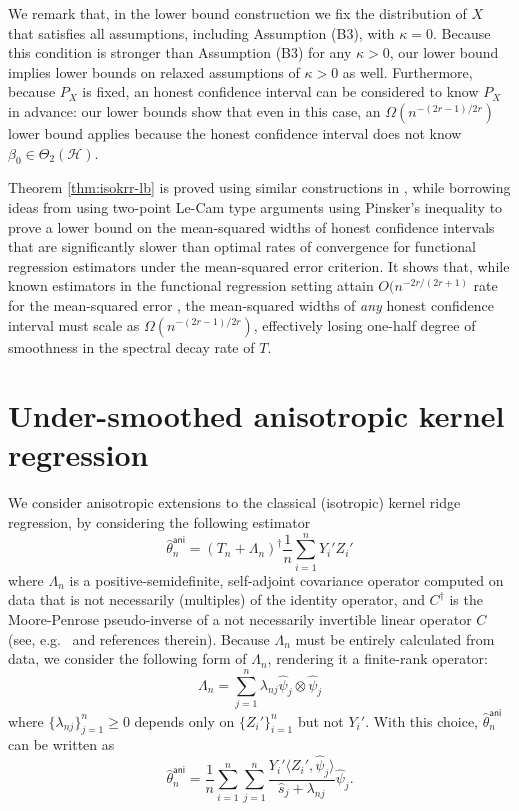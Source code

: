 \documentclass[11pt,a4paper]{article}
\renewcommand{\hat}{\widehat}
\theoremstyle{definition}
\theoremstyle{plain}
\theoremstyle{remark}
\newcommand{\mH}{\mathcal H}
\newcommand{\ani}{\mathsf{ani}}
\begin{document}
We remark that, in the lower bound construction we fix the distribution of $X$ that satisfies all assumptions, including Assumption (B3), with $\kappa=0$.
Because this condition is stronger than Assumption (B3) for any $\kappa>0$, our lower bound implies lower bounds on relaxed assumptions of $\kappa>0$ as well.
Furthermore, because $P_X$ is fixed, an honest confidence interval can be considered to know $P_X$ in advance: our lower bounds show that even in this case,
an $\Omega(n^{-(2r-1)/2r})$ lower bound applies because the honest confidence interval does not know $\beta_0\in\Theta_2(\mH)$.

Theorem \ref{thm:isokrr-lb} is proved using similar constructions in \citep{cai2012minimax}, while borrowing ideas from \citep{cai2006adaptive} 
using two-point Le-Cam type arguments using Pinsker's inequality to prove a lower bound on the mean-squared widths of honest confidence intervals
that are significantly slower than optimal rates of convergence for functional regression estimators under the mean-squared error criterion.
It shows that, while known estimators in the functional regression setting attain $O(n^{-2r/(2r+1)}$ rate for the mean-squared error \citep{cai2012minimax},
the mean-squared widths of \emph{any} honest confidence interval must scale as $\Omega(n^{-(2r-1)/2r})$, effectively losing one-half degree of smoothness in the spectral decay rate of $T$.

\section{Under-smoothed anisotropic kernel regression}\label{sec:anikrr}

We consider anisotropic extensions to the classical (isotropic) kernel ridge regression, by considering the following estimator
$$
\hat\theta_n^\ani = (T_n+\Lambda_n)^{\dagger}\frac{1}{n}\sum_{i=1}^n Y_i' Z_i'
$$
where $\Lambda_n$ is a positive-semidefinite, self-adjoint covariance operator computed on data that is not necessarily (multiples) of the identity operator,
and $C^\dagger$ is the Moore-Penrose pseudo-inverse of a not necessarily invertible linear operator $C$ (see, e.g.~\citep{fongi2023moore} and references therein).
Because $\Lambda_n$ must be entirely calculated from data, we consider the following form of $\Lambda_n$, rendering it a finite-rank operator:
$$
\Lambda_n = \sum_{j=1}^n \lambda_{nj}\hat\psi_j\otimes\hat\psi_j
$$
where $\{\lambda_{nj}\}_{j=1}^n\geq 0$ depends only on $\{Z_i'\}_{i=1}^n$ but not $Y_i'$.
With this choice, $\hat\theta_n^\ani$ can be written as
$$
\hat\theta_n^\ani = \frac{1}{n}\sum_{i=1}^n\sum_{j=1}^n \frac{Y_i'\langle Z_i',\hat\psi_j\rangle}{\hat s_j+\lambda_{nj}}\hat\psi_j.
$$
\end{document}
